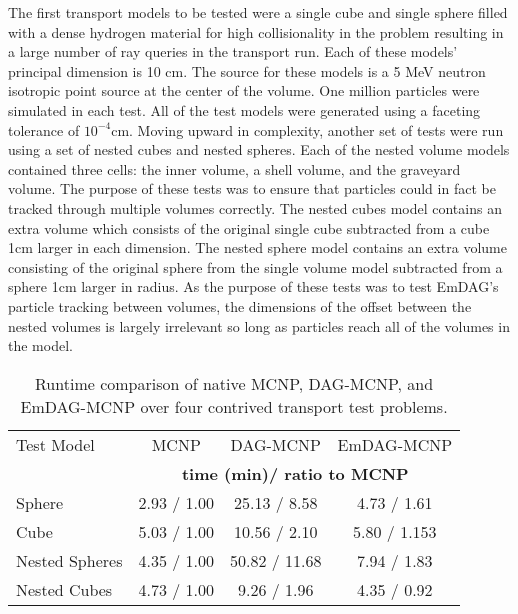 The first transport models to be tested were a single cube and single sphere
filled with a dense hydrogen material for high collisionality in the problem
resulting in a large number of ray queries in the transport run. Each of these
models' principal dimension is 10 cm. The source for these models is a 5 MeV
neutron isotropic point source at the center of the volume. One million
particles were simulated in each test. All of the test models were generated
using a faceting tolerance of $10^{-4}$cm. Moving upward in complexity, another
set of tests were run using a set of nested cubes and nested spheres. Each of
the nested volume models contained three cells: the inner volume, a shell
volume, and the graveyard volume. The purpose of these tests was to ensure that
particles could in fact be tracked through multiple volumes correctly. The
nested cubes model contains an extra volume which consists of the original
single cube subtracted from a cube 1cm larger in each dimension. The nested
sphere model contains an extra volume consisting of the original sphere from the
single volume model subtracted from a sphere 1cm larger in radius. As the
purpose of these tests was to test EmDAG's particle tracking between volumes, the
dimensions of the offset between the nested volumes is largely irrelevant so
long as particles reach all of the volumes in the model.

\begin{table}[H]
  \small
  \begin{center}
    
    \begin{tabular}{lccc}

      \toprule
      Test Model & MCNP & DAG-MCNP & EmDAG-MCNP \\
      & \multicolumn{3}{c}{\textbf{time (min)/ ratio to MCNP}} \\
      \hline
      Sphere & 2.93 / 1.00 & 25.13 / 8.58  & 4.73 / 1.61  \\
      Cube & 5.03 / 1.00 & 10.56 / 2.10 & 5.80 / 1.153 \\
      Nested Spheres & 4.35 / 1.00  & 50.82 / 11.68  & 7.94 / 1.83 \\
      Nested Cubes & 4.73 / 1.00 & 9.26 / 1.96 & 4.35 / 0.92 \\
      \bottomrule
      
    \end{tabular}
  \end{center}
  \caption[Comparative performance results of EmDAG-MCNP.]{Runtime comparison of
    native MCNP, DAG-MCNP, and EmDAG-MCNP over four contrived transport test
    problems.}
      \label{timings}
\end{table}

